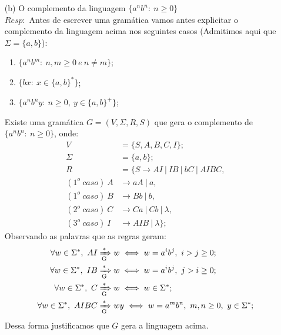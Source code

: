 \documentclass{homework}
\begin{document}
\pagestyle{fancy}

	\begin{itemize}
		\item[(b)] O complemento da linguagem $\{a^n b^n:\ n \geq 0\}$\\
		$Resp:$ Antes de escrever uma gramática vamos antes explicitar o complemento da linguagem acima nos seguintes casos (Admitimos aqui que $\Sigma = \{a,b\}$):
		\begin{enumerate}
			\item $\{a^n b^m:\ n,m \geq 0\ e\ n \neq m\}$;
			\item $\{b x:\ x \in \{a,b\}^*\}$;
			\item $\{a^n b^n y:\ n \geq 0,\ y \in \{a,b\}^+\}$;
		\end{enumerate}		 Existe uma gramática $G = (V, \Sigma, R, S)$ que gera o complemento de $\{a^n b^n:\ n \geq 0\}$, onde: %
		\begin{align*}
			V &= \{S, A, B, C, I\};\\
			\Sigma &= \{a,b\};\\
			R &= \{S \rightarrow AI\ |\ IB\ |\ bC\ |\ AIBC,\\
			(1^o\ caso)\ A & \rightarrow aA\ |\ a,\\
			(1^o\ caso)\ B & \rightarrow Bb\ |\ b,\\
			(2^o\ caso)\ C & \rightarrow Ca\ |\ Cb\ |\ \lambda,\\
			(3^o\ caso)\ I & \rightarrow AIB\ |\ \lambda\};
		\end{align*}
		Observando as palavras que as regras geram:
		\begin{align*}
			\forall w \in \Sigma^*,\  AI & \xRightarrow[\text{G}]{*} w \iff w = a^i b^j,\ i > j\geq 0;\\
			\forall w \in \Sigma^*,\  IB & \xRightarrow[\text{G}]{*} w \iff w = a^i b^j,\ j > i \geq 0;\\
			\forall w \in \Sigma^*,\  C & \xRightarrow[\text{G}]{*} w \iff w \in \Sigma^*;\\
			\forall w \in \Sigma^*,\  AIBC & \xRightarrow[\text{G}]{*} wy \iff w = a^m b^n,\ m,n \geq 0,\ y \in \Sigma^*;
		\end{align*}
		Dessa forma justificamos que $G$ gera a linguagem acima.


\end{itemize}
\end{document}
